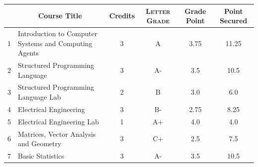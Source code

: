 \documentclass[11pt]{article}
\newcommand*{\numtwo}[1]{\pgfmathprintnumber[
                    fixed, precision=2, fixed zerofill=true]{#1}}
\begin{document}
                \begin{center}
                    \renewcommand{\arraystretch}{1.08}
                    
                \begin{tabular}{|c|l|c|>{\scshape}c|c|c|}
                \hline  \rule[-1ex]{0pt}{3.5ex} {\centering{\bf Course Code}} &  \multicolumn{1}{c|}{\textbf{Course Title}}  & {\bf Credits} & {\bf Letter Grade} & {\bf Grade Point} & {\bf Point Secured}  \\ 
                \hline   1 &  Introduction to Computer Systems and Computing Agents		 & 3 & A & 3.75 & 11.25 \\ %
                \hline   2 &  Structured Programming Language		 & 3 & A- & 3.5 & 10.5 \\ %
                \hline   3 &  Structured Programming Language Lab		 & 2 & B & 3.0 & 6.0 \\ %
                \hline   4 &  Electrical Engineering		 & 3 & B- & 2.75 & 8.25 \\ %
                \hline   5 &  Electrical Engineering Lab		 & 1 & A+ & 4.0 & 4.0 \\ %
                \hline   6 &  Matrices, Vector Analysis and Geometry		 & 3 & C+ & 2.5 & 7.5 \\ %
                \hline   7 &  Basic Statistics		 & 3 & A- & 3.5 & 10.5 \\ %

\hline                %
                \end{tabular}
                \end{center}
                \renewcommand{\arraystretch}{1.03}
\end{document}
